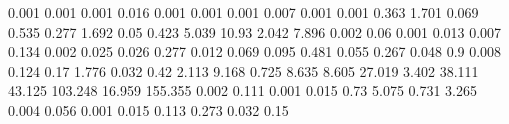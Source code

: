 0.001      0.001      %
0.001      0.016      %
0.001      0.001      %
0.001      0.007      %
0.001      0.001      %
0.363      1.701      %
0.069      0.535      %
0.277      1.692      %
0.05       0.423      %
5.039      10.93      %
2.042      7.896      %
0.002      0.06       %
0.001      0.013      %
0.007      0.134      %
0.002      0.025      %
0.026      0.277      %
0.012      0.069      %
0.095      0.481      %
0.055      0.267      %
0.048      0.9        %
0.008      0.124      %
0.17       1.776      %
0.032      0.42       %
2.113      9.168      %
0.725      8.635      %
8.605      27.019     %
3.402      38.111     %
43.125     103.248    %
16.959     155.355    %
0.002      0.111      %
0.001      0.015      %
0.73       5.075      %
0.731      3.265      %
0.004      0.056      %
0.001      0.015      %
0.113      0.273      %
0.032      0.15       %
